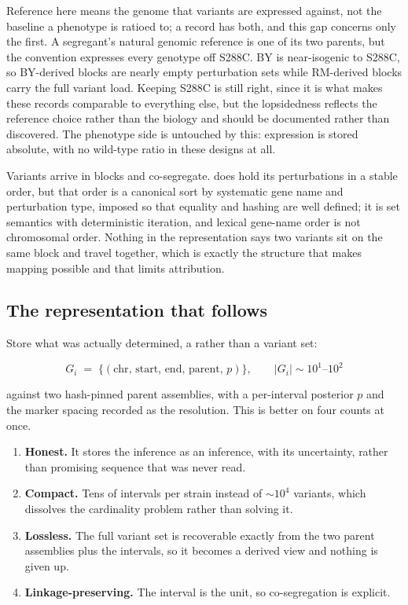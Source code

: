  Reference here means the genome that variants are expressed
against, not the baseline a phenotype is ratioed to; a record has both, and this gap
concerns only the first. A segregant's natural genomic reference is one of its two
parents, but the convention expresses every genotype off S288C. BY is near-isogenic to
S288C, so BY-derived blocks are nearly empty perturbation sets while RM-derived blocks
carry the full variant load. Keeping S288C is still right, since it is what makes these
records comparable to everything else, but the lopsidedness reflects the reference choice
rather than the biology and should be documented rather than discovered. The phenotype
side is untouched by this: expression is stored absolute, with no wild-type ratio in
these designs at all.

 Variants arrive in blocks and co-segregate.
 does hold its perturbations in a stable order, but that order is a
canonical sort by systematic gene name and perturbation type, imposed so that equality
and hashing are well defined; it is set semantics with deterministic iteration, and
lexical gene-name order is not chromosomal order. Nothing in the representation says two
variants sit on the same block and travel together, which is exactly the structure that
makes mapping possible and that limits attribution.

\subsection{The representation that follows}\label{sec:proposal}

Store what was actually determined, a  rather than a variant set:

$$
G_i \;=\; \big\{ (\text{chr},\, \text{start},\, \text{end},\, \text{parent},\, p) \big\},
\qquad |G_i| \sim 10^1\text{--}10^2
$$

against two hash-pinned parent assemblies, with a per-interval posterior $p$ and the marker
spacing recorded as the resolution. This is better on four counts at once.

\begin{enumerate}[leftmargin=1.4em,itemsep=1pt,topsep=2pt]
  \item \textbf{Honest.} It stores the inference as an inference, with its uncertainty,
    rather than promising sequence that was never read.
  \item \textbf{Compact.} Tens of intervals per strain instead of $\sim\!10^4$ variants,
    which dissolves the cardinality problem rather than solving it.
  \item \textbf{Lossless.} The full variant set is recoverable exactly from the two parent
    assemblies plus the intervals, so it becomes a derived view and nothing is given up.
  \item \textbf{Linkage-preserving.} The interval is the unit, so co-segregation is
    explicit.
\end{enumerate}

